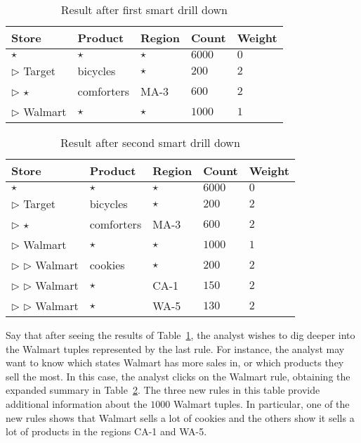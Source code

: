\begin{example}
\begin{table}
\centering
\begin{tabular}{| l | l | l | l | l |}
\hline Store & Product & Region & Count & Weight \\
\hline
$\star$ & $\star$ & $\star$ & $6000$ & $0$ \\ \hline
$\triangleright$ Target & bicycles & $\star$ & $200$ & $2$ \\ \hline
$\triangleright$ $\star$ & comforters & MA-3 & $600$ & $2$ \\ \hline
$\triangleright$ Walmart & $\star$ & $\star$ & $1000$ & $1$ \\ \hline
\end{tabular}
\caption{Result after first smart drill down}\label{table:introexample}
\end{table}

\begin{table}
\centering
\begin{tabular}{| l | l | l | l | l |}
\hline Store & Product & Region & Count & Weight \\
\hline
$\star$ & $\star$ & $\star$ & $6000$ & $0$ \\  \cline{1-5}
$\triangleright$ Target & bicycles & $\star$ & $200$ & $2$ \\ \cline{1-5}
$\triangleright$ $\star$ & comforters & MA-3 & $600$ & $2$ \\ \cline{1-5}
$\triangleright$ Walmart & $\star$ & $\star$ & $1000$ & $1$ \\ \cline{2-5}
$\triangleright$ $\triangleright$ Walmart & cookies & $\star$ & $200$ & $2$ \\ \cline{2-5}
$\triangleright$ $\triangleright$ Walmart & $\star$ & CA-1 & $150$ & $2$ \\ \cline{2-5}
$\triangleright$ $\triangleright$ Walmart & $\star$ & WA-5 & $130$ & $2$ \\ \hline
\end{tabular}
\caption{Result after second smart drill down} \label{table:introexample2}
\end{table}

Say that after seeing the results of Table~\ref{table:introexample},
the analyst wishes to dig deeper into the Walmart tuples
represented by the last rule.
For instance, the analyst may want to know
which states Walmart has more sales in, or which products they sell
the most. In this case, the analyst clicks on the Walmart rule,
obtaining the expanded summary in Table~\ref{table:introexample2}.
The three new rules in this table provide additional information
about the $1000$ Walmart tuples.
In particular, one of the new rules shows that
Walmart sells a lot of cookies and the others show it sells a lot of products in
the regions CA-1 and WA-5.


\end{example}
